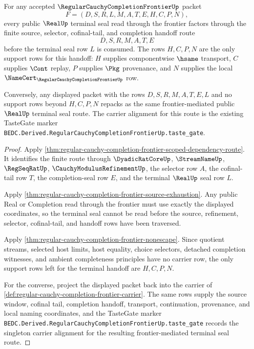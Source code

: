 \begin{theorem}
\label{thm:regular-cauchy-completion-frontier-real-terminal-cofinal-route}
For any accepted $\RegularCauchyCompletionFrontierUp$ packet
$$
F=(D,S,R,L,M,A,T,E,H,C,P,N),
$$
every public $\RealUp$ terminal seal read through the frontier factors through the finite source, selector, cofinal-tail, and completion handoff route
$$
D,S,R,M,A,T,E
$$
before the terminal seal row $L$ is consumed. The rows $H,C,P,N$ are the only support rows for this handoff: $H$ supplies componentwise $\hsame$ transport, $C$ supplies $\Cont$ replay, $P$ supplies $\Pkg$ provenance, and $N$ supplies the local $\NameCert_{\RegularCauchyCompletionFrontierUp}$ row.

Conversely, any displayed packet with the rows $D,S,R,M,A,T,E,L$ and no support rows beyond $H,C,P,N$ repacks as the same frontier-mediated public $\RealUp$ terminal seal route. The carrier alignment for this route is the existing TasteGate marker \texttt{BEDC.Derived.RegularCauchyCompletionFrontierUp.taste\_gate}.
\end{theorem}
\begin{proof}
Apply \autoref{thm:regular-cauchy-completion-frontier-scoped-dependency-route}. It identifies the finite route through $\DyadicRatCoreUp$, $\StreamNameUp$, $\RegSeqRatUp$, $\CauchyModulusRefinementUp$, the selector row $A$, the cofinal-tail row $T$, the completion-seal row $E$, and the terminal $\RealUp$ seal row $L$.

Apply \autoref{thm:regular-cauchy-completion-frontier-source-exhaustion}. Any public Real or Completion read through the frontier must use exactly the displayed coordinates, so the terminal seal cannot be read before the source, refinement, selector, cofinal-tail, and handoff rows have been traversed.

Apply \autoref{thm:regular-cauchy-completion-frontier-nonescape}. Since quotient streams, selected host limits, host equality, choice selectors, detached completion witnesses, and ambient completeness principles have no carrier row, the only support rows left for the terminal handoff are $H,C,P,N$.

For the converse, project the displayed packet back into the carrier of \autoref{def:regular-cauchy-completion-frontier-carrier}. The same rows supply the source window, cofinal tail, completion handoff, transport, continuation, provenance, and local naming coordinates, and the TasteGate marker \texttt{BEDC.Derived.RegularCauchyCompletionFrontierUp.taste\_gate} records the singleton carrier alignment for the resulting frontier-mediated terminal seal route.
\end{proof}

